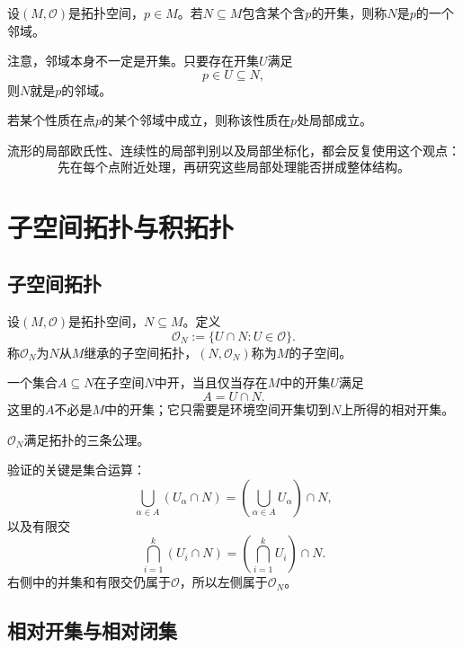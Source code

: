 \begin{definition}[邻域]
设$(M,\mathcal O)$是拓扑空间，$p\in M$。若$N\subseteq M$包含某个含$p$的开集，则称$N$是$p$的一个邻域。
\end{definition}

注意，邻域本身不一定是开集。只要存在开集$U$满足
\[
    p\in U\subseteq N,
\]
则$N$就是$p$的邻域。

\begin{definition}[局部性质]
若某个性质在点$p$的某个邻域中成立，则称该性质在$p$处局部成立。
\end{definition}

流形的局部欧氏性、连续性的局部判别以及局部坐标化，都会反复使用这个观点：
\[
    \text{先在每个点附近处理，再研究这些局部处理能否拼成整体结构。}
\]


\section{子空间拓扑与积拓扑}

\subsection{子空间拓扑}

\begin{definition}[子空间拓扑]
设$(M,\mathcal O)$是拓扑空间，$N\subseteq M$。定义
\[
    \mathcal O_N
    :=
    \{U\cap N:U\in\mathcal O\}.
\]
称$\mathcal O_N$为$N$从$M$继承的子空间拓扑，$(N,\mathcal O_N)$称为$M$的子空间。
\end{definition}

一个集合$A\subseteq N$在子空间$N$中开，当且仅当存在$M$中的开集$U$满足
\[
    A=U\cap N.
\]
这里的$A$不必是$M$中的开集；它只需要是环境空间开集切到$N$上所得的相对开集。

\begin{proposition}[子空间拓扑确实是拓扑]
$\mathcal O_N$满足拓扑的三条公理。
\end{proposition}

验证的关键是集合运算：
\[
    \bigcup_{\alpha\in A}(U_\alpha\cap N)
    =
    \left(\bigcup_{\alpha\in A}U_\alpha\right)\cap N,
\]
以及有限交
\[
    \bigcap_{i=1}^k(U_i\cap N)
    =
    \left(\bigcap_{i=1}^kU_i\right)\cap N.
\]
右侧中的并集和有限交仍属于$\mathcal O$，所以左侧属于$\mathcal O_N$。

\subsection{相对开集与相对闭集}

